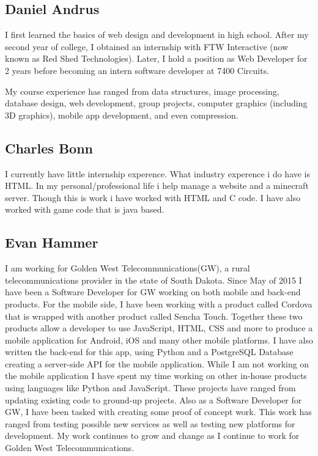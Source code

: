 \subsection{Daniel Andrus}

I first learned the basics of web design and development in high school. After my second year of college, I obtained an internship with FTW Interactive (now known as Red Shed Technologies). Later, I hold a position as Web Developer for 2 years before becoming an intern software developer at 7400 Circuits.

My course experience has ranged from data structures, image processing, database design, web development, group projects, computer graphics (including 3D graphics), mobile app development, and even compression.

\subsection{Charles Bonn}

I currently have little internship experence. What industry experence i do have is HTML. In my personal/professional life i help manage a website and a minecraft server. Though this is work i have worked with HTML and C code. I have also worked with game code that is java based.

\subsection{Evan Hammer}

I am working for Golden West Telecommunications(GW), a rural telecommunications provider in the state of South Dakota.  Since May of 2015 I have been a Software Developer for GW working on both mobile and back-end products.  For the mobile side, I have been working with a product called Cordova that is wrapped with another product called Sencha Touch.  Together these two products allow a developer to use JavaScript, HTML, CSS and more to produce a mobile application for Android, iOS and many other mobile platforms.  I have also written the back-end for this app, using Python and a PostgreSQL Database creating a server-side API for the mobile application.  While I am not working on the mobile application I have spent my time working on other in-house products using languages like Python and JavaScript.  These projects have ranged from updating existing code to ground-up projects.  Also as a Software Developer for GW, I have been tasked with creating some proof of concept work.  This work has ranged from testing possible new services as well as testing new platforms for development.  My work continues to grow and change as I continue to work for Golden West Telecommunications.

